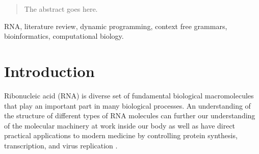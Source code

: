 \documentclass[journal]{IEEEtran}
\begin{document}







\maketitle

\begin{abstract}
The abstract goes here.
\end{abstract}

\begin{IEEEkeywords}
RNA, literature review, dynamic programming, context free grammars, bioinformatics, computational biology.
\end{IEEEkeywords}






%
\IEEEpeerreviewmaketitle



\section{Introduction}
\label{sec:intro}

Ribonucleic acid (RNA) is diverse set of fundamental biological macromolecules that play an important part in many biological processes. An understanding of the structure of different types of RNA molecules can further our understanding of the molecular machinery at work inside our body as well as have direct practical applications to modern medicine by controlling protein synthesis, transcription, and virus replication \cite{schlick2010molecular}.
\end{document}
